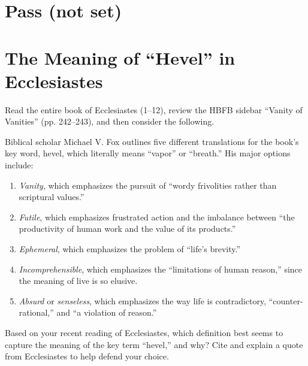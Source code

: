 \documentclass[12pt]{article}
\begin{document}
\section{Pass (not set)}


\section{The Meaning of “Hevel” in Ecclesiastes}

Read the entire book of Ecclesiastes (1–12), review the HBFB sidebar “Vanity of Vanities” (pp. 242–243), and then consider the following.

Biblical scholar Michael V. Fox outlines five different translations for the book’s key word, hevel, which literally means “vapor” or “breath.” His major options include:

\begin{enumerate}
\item \emph{Vanity}, which emphasizes the pursuit of “wordy frivolities rather than scriptural values.”
\item \emph{Futile}, which emphasizes frustrated action and the imbalance between “the productivity of human work and the value of its products.”
\item \emph{Ephemeral}, which emphasizes the problem of “life’s brevity.”
\item \emph{Incomprehensible}, which emphasizes the “limitations of human reason,” since the meaning of live is so elusive.
\item \emph{Absurd} or \emph{senseless}, which emphasizes the  way life is contradictory, “counter-rational,” and “a violation of reason.”
\end{enumerate}

Based on your recent reading of Ecclesiastes, which definition best seems to capture the meaning of the key term “hevel,” and why? Cite and explain a quote from Ecclesiastes to help defend your choice.
\end{document}
